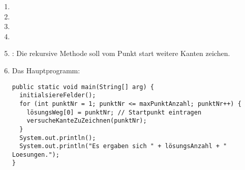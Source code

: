 \documentclass{lehramt-informatik-aufgabe}
\begin{document}
\begin{enumerate}
\item {}
\item {}
\item {}
\item {}
\item {}: Die rekursive
Methode soll vom Punkt start weitere Kanten zeichen.

\item Das Hauptprogramm:

\begin{verbatim}
public static void main(String[] arg) {
  initialsiereFelder();
  for (int punktNr = 1; punktNr <= maxPunktAnzahl; punktNr++) {
    lösungsWeg[0] = punktNr; // Startpunkt eintragen
    versucheKanteZuZeichnen(punktNr);
  }
  System.out.println();
  System.out.println("Es ergaben sich " + lösungsAnzahl + " Loesungen.");
}
\end{verbatim}

\end{enumerate}

\end{document}
